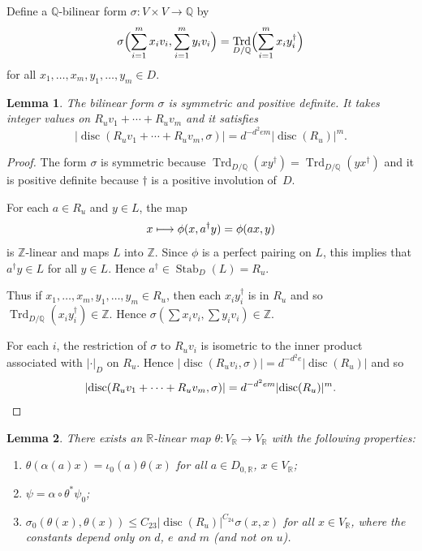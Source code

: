 \documentclass[11pt]{article}
\numberwithin{equation}{section}
\newenvironment{enumeratei}
{\bgroup\def\theenumi{\roman{enumi}}\def\theenumii{\alph{enumii}}\begin{enumerate}}
{\end{enumerate}\egroup}
\def\mto{\mathchoice{\longmapsto}{\mapsto}{\mapsto}{\mapsto}}
\newcommand{\bQ}{\mathbb{Q}}
\newcommand{\bR}{\mathbb{R}}
\newcommand{\bZ}{\mathbb{Z}}
\DeclareMathOperator{\disc}{disc}
\DeclareMathOperator{\Stab}{Stab}
\DeclareMathOperator{\Trd}{Trd}
\newcommand{\abs}[1]{\lvert #1 \rvert}
\newtheorem{lemma}{Lemma}[section]
\begin{document}
Define a $\bQ$-bilinear form $\sigma \colon V \times V \to \bQ$ by
\[
\sigma \Bigl( \sum_{i=1}^m x_i v_i, \sum_{i=1}^m y_i v_i \Bigr) = \Trd_{D/\bQ} \Bigl(\sum_{i=1}^m x_i y_i^\dag\Bigr)
\]
for all $x_1, \dotsc, x_m, y_1, \dotsc, y_m \in D$.

\begin{lemma} \label{sigma-integral}
The bilinear form $\sigma$ is symmetric and positive definite.
It takes integer values on $R_uv_1 + \dotsb + R_uv_m$ and it satisfies
\[
\abs{\disc(R_uv_1 + \dotsb + R_uv_m, \sigma)} = d^{-d^2em} \abs{\disc(R_u)}^m.
\]
\end{lemma}

\begin{proof}
The form $\sigma$ is symmetric because $\Trd_{D/\bQ}(xy^\dag) = \Trd_{D/\bQ}(yx^\dag)$ and it is positive definite because $\dag$ is a positive involution of~$D$.

For each $a \in R_u$ and $y \in L$, the map
\[
x \mto \phi(x, a^\dag y) = \phi(ax, y)
\]
is $\bZ$-linear and maps $L$ into $\bZ$.
Since $\phi$ is a perfect pairing on $L$, this implies that $a^\dag y \in L$ for all $y \in L$.
Hence $a^\dag \in \Stab_D(L) = R_u$.

Thus if $x_1, \dotsc, x_m, y_1, \dotsc, y_m \!\in\! R_u$, then each $x_iy_i^\dag$ is in $R_u$ and so \hbox{$\Trd_{D/\bQ}(x_iy_i^\dag) \!\in\! \bZ$}.
Hence $\sigma(\sum x_i v_i, \sum y_i v_i) \in \bZ$.

For each $i$, the restriction of $\sigma$ to $R_uv_i$ is isometric to the inner product associated with $\abs{\cdot}_D$ on $R_u$.
Hence $\abs{\disc(R_uv_i, \sigma)} = d^{-d^2e} \abs{\disc(R_u)}$ and so
\[
\abs{\disc(R_uv_1 + \dotsb + R_uv_m, \sigma)} = d^{-d^2em} \abs{\disc(R_u)}^m.
\qedhere
\]
\end{proof}

\begin{lemma} \label{theta-def}
There exists an $\bR$-linear map $\theta \colon V_\bR \to V_\bR$ with the following properties:
\begin{enumeratei}
\item\label{theta-defi} $\theta(\alpha(a)x) = \iota_0(a)\theta(x)$ for all $a \in D_{0,\bR}$, $x \in V_\bR$;
\item\label{theta-defii} $\psi = \alpha \circ \theta^* \psi_0$;
\item\label{theta-defiii} $\sigma_0(\theta(x), \theta(x)) \leq C_{23} \abs{\disc(R_u)}^{C_{24}} \sigma(x,x)$ for all $x \in V_\bR$, where the constants depend only on $d$, $e$ and $m$ (and not on $u$).
\end{enumeratei}
\end{lemma}
\end{document}
